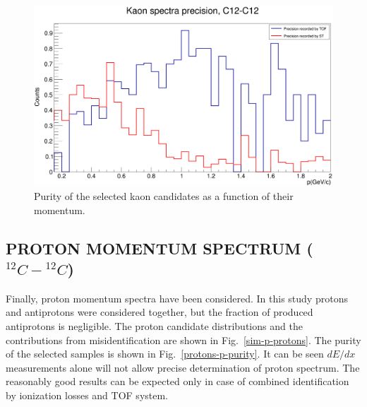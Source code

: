 \documentclass[12pt]{article}
\begin{document}
\begin{figure}[h]
\vspace{0.1cm}
	\centering
	\includegraphics[width=.6\textwidth]{KaonSpectraPrecision_C12.png}
	\caption{Purity of the selected kaon candidates as a function of their momentum.}
	\label{kaons-p-purity}
\end{figure}

\clearpage

\subsection{PROTON MOMENTUM SPECTRUM ($^{12}C-{^{12}C}$)}
Finally, proton momentum spectra have been considered. In this study
protons and antiprotons were considered together, but the fraction of produced
antiprotons is negligible. The proton candidate distributions and the contributions
from misidentification are shown in Fig.~\ref{sim-p-protons}. The purity of the
selected samples is shown in Fig.~\ref{protons-p-purity}. It can be seen
$dE/dx$ measurements alone will not allow precise determination of
proton spectrum. The reasonably good results can be expected only in case
of combined identification by ionization losses and TOF system.
\end{document}
